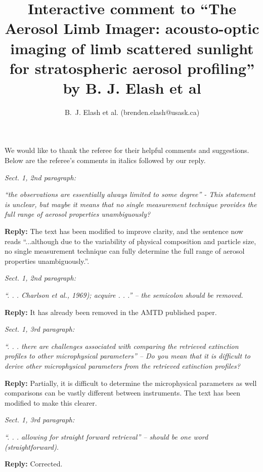\documentclass[12pt, notitlepage]{article}
\title{Interactive comment to ``The Aerosol Limb Imager: acousto-optic imaging of limb scattered
sunlight for stratospheric aerosol profiling'' by B. J. Elash et al}
\author{B.~J. Elash et al. (brenden.elash@usask.ca)}
\begin{document}
\begin{titlepage}
\maketitle
\end{titlepage}


We would like to thank the referee for their helpful comments and suggestions. Below are the referee's comments in italics followed by our reply.

\hrulefill

\textit{Sect. 1, 2nd paragraph:}

\textit{``the observations are essentially always limited to some degree'' - This statement is
unclear, but maybe it means that no single measurement technique provides the full
range of aerosol properties unambiguously?}

\textbf{Reply:} The text has been modified to improve clarity, and the sentence now reads ``...although due to the variability of physical composition
and particle size, no single measurement technique can fully determine the full range of aerosol properties unambiguously.''.

\hrulefill

\textit{Sect. 1, 2nd paragraph:}

\textit{``. . . Charlson et al., 1969); acquire . . .'' – the semicolon should be removed.}

\textbf{Reply:} It has already been removed in the AMTD published paper.

\hrulefill

\textit{Sect. 1, 3rd paragraph:}

\textit{``. . . there are challenges associated with comparing the retrieved extinction profiles
to other microphysical parameters'' – Do you mean that it is difficult to derive other
microphysical parameters from the retrieved extinction profiles?}

\textbf{Reply:} Partially, it is difficult to determine the microphysical parameters as well comparisons can be vastly different between instruments. The text has been modified to make this clearer.

\hrulefill

\textit{Sect. 1, 3rd paragraph:}

\textit{``. . . allowing for straight forward retrieval'' – should be one word (straightforward).}

\textbf{Reply:} Corrected.

\hrulefill
\end{document}
